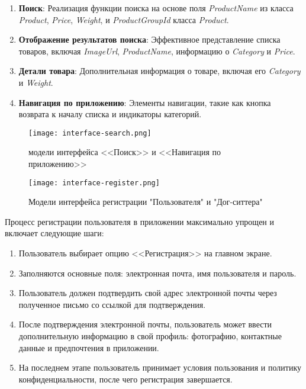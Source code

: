 \begin{enumerate}
    \item \textbf{Поиск}: Реализация функции поиска на основе поля \textit{ProductName} из класса \textit{Product}, \textit{Price}, \textit{Weight}, и \textit{ProductGroupId} класса \textit{Product}.
    \item \textbf{Отображение результатов поиска}: Эффективное представление списка товаров, включая \textit{ImageUrl}, \textit{ProductName}, информацию о \textit{Category} и \textit{Price}.
    \item \textbf{Детали товара}: Дополнительная информация о товаре, включая его \textit{Category} и \textit{Weight}.
    \item \textbf{Навигация по приложению}: Элементы навигации, такие как кнопка возврата к началу списка и индикаторы категорий.
\end{enumerate}

\begin{figure}[h!]
    \texttt{[image: interface-search.png]}
    \caption{модели интерфейса <<Поиск>> и <<Навигация по приложению>>}
    \label{fig:search}
\end{figure}

\begin{figure}[h!]
    \texttt{[image: interface-register.png]}
    \caption{Модели интерфейса регистрации "Пользователя" и "Дог-ситтера"}
    \label{fig:register}
\end{figure}

Процесс регистрации пользователя в приложении максимально упрощен и включает следующие шаги:
\begin{enumerate}
    \item Пользователь выбирает опцию <<Регистрация>> на главном экране.
    \item Заполняются основные поля: электронная почта, имя пользователя и пароль.
    \item Пользователь должен подтвердить свой адрес электронной почты через полученное письмо со ссылкой для подтверждения.
    \item После подтверждения электронной почты, пользователь может ввести дополнительную информацию в свой профиль: фотографию, контактные данные и предпочтения в приложении.
    \item На последнем этапе пользователь принимает условия пользования и политику конфиденциальности, после чего регистрация завершается.
\end{enumerate}

